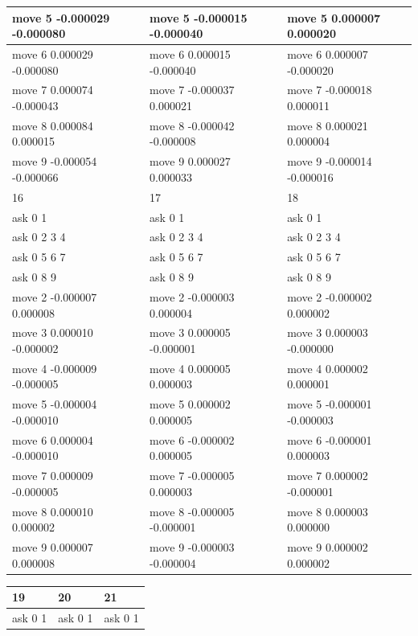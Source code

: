 \documentclass{ctexart}
\begin{document}
\begin{flushleft}
\begin{table}[H]
\begin{tabular}{|l|l|l|}
      move 5 -0.000029 -0.000080 & move 5 -0.000015 -0.000040 & move 5 0.000007 0.000020 \\ \hline
      move 6 0.000029 -0.000080 & move 6 0.000015 -0.000040 & move 6 0.000007 -0.000020 \\ \hline
      move 7 0.000074 -0.000043 & move 7 -0.000037 0.000021 & move 7 -0.000018 0.000011 \\ \hline
      move 8 0.000084 0.000015 & move 8 -0.000042 -0.000008 & move 8 0.000021 0.000004 \\ \hline
      move 9 -0.000054 -0.000066 & move 9 0.000027 0.000033 & move 9 -0.000014 -0.000016 \\ \hline
      16 & 17 & 18 \\ \hline
      ask 0 1 & ask 0 1 & ask 0 1 \\ \hline
      ask 0 2 3 4 & ask 0 2 3 4 & ask 0 2 3 4 \\ \hline
      ask 0 5 6 7 & ask 0 5 6 7 & ask 0 5 6 7 \\ \hline
      ask 0 8 9 & ask 0 8 9 & ask 0 8 9 \\ \hline
      move 2 -0.000007 0.000008 & move 2 -0.000003 0.000004 & move 2 -0.000002 0.000002 \\ \hline
      move 3 0.000010 -0.000002 & move 3 0.000005 -0.000001 & move 3 0.000003 -0.000000 \\ \hline
      move 4 -0.000009 -0.000005 & move 4 0.000005 0.000003 & move 4 0.000002 0.000001 \\ \hline
      move 5 -0.000004 -0.000010 & move 5 0.000002 0.000005 & move 5 -0.000001 -0.000003 \\ \hline
      move 6 0.000004 -0.000010 & move 6 -0.000002 0.000005 & move 6 -0.000001 0.000003 \\ \hline
      move 7 0.000009 -0.000005 & move 7 -0.000005 0.000003 & move 7 0.000002 -0.000001 \\ \hline
      move 8 0.000010 0.000002 & move 8 -0.000005 -0.000001 & move 8 0.000003 0.000000 \\ \hline
      move 9 0.000007 0.000008 & move 9 -0.000003 -0.000004 & move 9 0.000002 0.000002 \\ \hline
    \end{tabular}
  \end{table}
      \begin{table}[H]
        \centering
        \begin{tabular}{|l|l|l|}
        \hline
      19 & 20 & 21 \\ \hline
      ask 0 1 & ask 0 1 & ask 0 1 \\ \hline

\end{tabular}
\end{table}
\end{flushleft}
\end{document}
